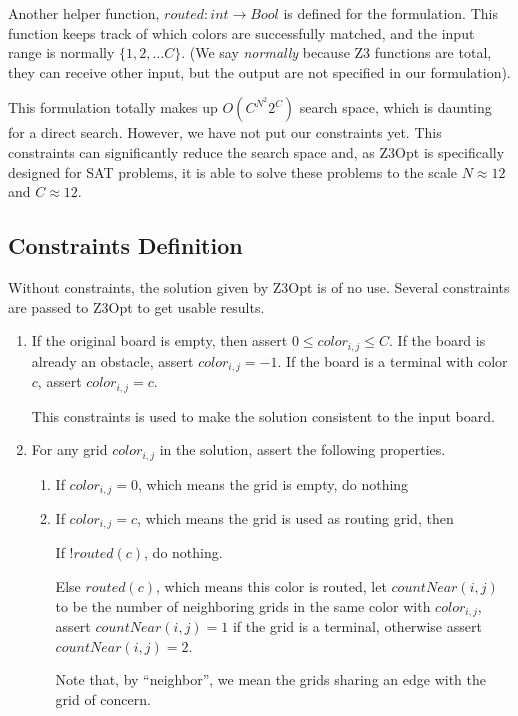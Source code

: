 \documentclass{article}
\begin{document}
\begin{spacing}{1.1}
    Another helper function, $routed: int \to Bool$ is defined for the formulation. This function keeps track of which colors are successfully matched, and the input range is normally $\{1, 2, \ldots C\}$. (We say \emph{normally} because Z3 functions are total, they can receive
    other input, but the output are not specified in our formulation).

    This formulation totally makes up $O(C^{N^2}2^C)$ search space, which is daunting for a direct search. However, we have not put our constraints yet. This constraints can significantly reduce the search space and, as Z3Opt is specifically designed for SAT problems, it is able to solve these problems to the scale $N \approx 12$ and $C \approx 12$.
    \subsection{Constraints Definition}
    \label{CON:D}
    Without constraints, the solution given by Z3Opt is of no use. Several constraints are passed to Z3Opt to get usable results.
    \begin{enumerate}[label = \arabic*. ]
        \item If the original board is empty, then assert $0 \le color_{i, j} \le C$. If the board is already an obstacle, assert $color_{i, j} = -1$. If the board is a terminal with color $c$, assert $color_{i, j} = c$.

        This constraints is used to make the solution consistent to the input board.

        \item For any grid $color_{i, j}$ in the solution, assert the following properties.
        \begin{enumerate} [label = \alph*. ]
            \item If $color_{i, j} = 0$, which means the grid is empty, do nothing
            \item If $color_{i, j} = c$, which means the grid is used as routing grid, then

            If $!routed(c)$, do nothing.

            Else $routed(c)$, which means this color is routed, let $countNear(i, j)$ to be the number of neighboring grids in the same color with $color_{i, j}$,  assert $countNear(i, j) = 1$ if the grid is a terminal, otherwise assert $countNear(i, j) = 2$.

            Note that, by ``neighbor'', we mean the grids sharing an edge with the grid of concern.
        \end{enumerate}


\end{enumerate}
\end{spacing}
\end{document}
